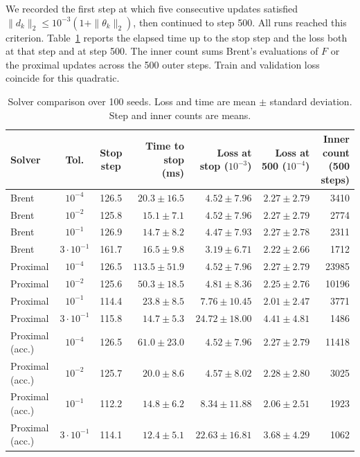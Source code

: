\documentclass[11pt,a4paper]{article}
\begin{document}
We recorded the first step at which five consecutive updates satisfied
$\|d_k\|_2\leq 10^{-3}(1+\|\theta_k\|_2)$, then continued to step 500.
All runs reached this criterion. Table~\ref{tab:solver-comparison} reports
the elapsed time up to the stop step and the loss both at that step and
at step 500. The inner count sums Brent's evaluations of $F$ or the
proximal updates across the 500 outer steps. Train and validation loss
coincide for this quadratic.

\begin{table}[!htbp]
    \centering
    \small
    \setlength{\tabcolsep}{5pt}
    \caption{Solver comparison over 100 seeds. Loss and time are mean
    $\pm$ standard deviation. Step and inner counts are means.}
    \label{tab:solver-comparison}
    \smallskip
    \begin{tabular}{lccrrrr}
        \hline
        Solver & Tol. & Stop step
        & \shortstack{Time to stop\\(ms)}
        & \shortstack{Loss at stop\\($10^{-3}$)}
        & \shortstack{Loss at 500\\($10^{-4}$)}
        & \shortstack{Inner count\\(500 steps)} \\
        \hline
        Brent & $10^{-4}$ & 126.5 & $20.3 \pm 16.5$ & $4.52 \pm 7.96$ & $2.27 \pm 2.79$ & 3410 \\
        Brent & $10^{-2}$ & 125.8 & $15.1 \pm 7.1$ & $4.52 \pm 7.96$ & $2.27 \pm 2.79$ & 2774 \\
        Brent & $10^{-1}$ & 126.9 & $14.7 \pm 8.2$ & $4.47 \pm 7.93$ & $2.27 \pm 2.78$ & 2311 \\
        Brent & $3\cdot 10^{-1}$ & 161.7 & $16.5 \pm 9.8$ & $3.19 \pm 6.71$ & $2.22 \pm 2.66$ & 1712 \\
        \hline
        Proximal & $10^{-4}$ & 126.5 & $113.5 \pm 51.9$ & $4.52 \pm 7.96$ & $2.27 \pm 2.79$ & 23985 \\
        Proximal & $10^{-2}$ & 125.6 & $50.3 \pm 18.5$ & $4.81 \pm 8.36$ & $2.25 \pm 2.76$ & 10196 \\
        Proximal & $10^{-1}$ & 114.4 & $23.8 \pm 8.5$ & $7.76 \pm 10.45$ & $2.01 \pm 2.47$ & 3771 \\
        Proximal & $3\cdot 10^{-1}$ & 115.8 & $14.7 \pm 5.3$ & $24.72 \pm 18.00$ & $4.41 \pm 4.81$ & 1486 \\
        \hline
        Proximal (acc.) & $10^{-4}$ & 126.5 & $61.0 \pm 23.0$ & $4.52 \pm 7.96$ & $2.27 \pm 2.79$ & 11418 \\
        Proximal (acc.) & $10^{-2}$ & 125.7 & $20.0 \pm 8.6$ & $4.57 \pm 8.02$ & $2.28 \pm 2.80$ & 3025 \\
        Proximal (acc.) & $10^{-1}$ & 112.2 & $14.8 \pm 6.2$ & $8.34 \pm 11.88$ & $2.06 \pm 2.51$ & 1923 \\
        Proximal (acc.) & $3\cdot 10^{-1}$ & 114.1 & $12.4 \pm 5.1$ & $22.63 \pm 16.81$ & $3.68 \pm 4.29$ & 1062 \\
        \hline
    \end{tabular}
\end{table}
\end{document}
